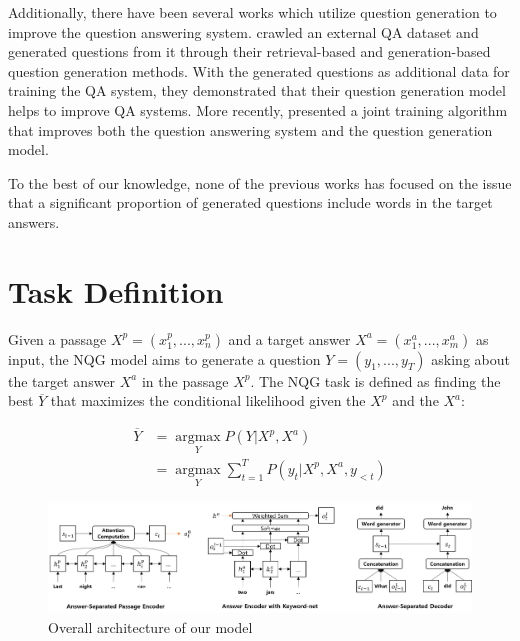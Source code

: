 \documentclass[letterpaper]{article} %
\begin{document}
Additionally, there have been several works which utilize question generation to improve the question answering system.
\cite{duan2017question} crawled an external QA dataset and generated questions from it through their retrieval-based and generation-based question generation methods. With the generated questions as additional data for training the QA system, they demonstrated that their question generation model helps to improve QA systems.
More recently,\cite{tang2018learning} presented a joint training algorithm that improves both the question answering system and the question generation model.

To the best of our knowledge, none of the previous works has focused on the issue that a significant proportion of generated questions include words in the target answers.

\section{Task Definition}
Given a passage \(X^p = (x^p_1, ...,x^p_n)\) and a target answer \(X^a = (x^a_1, ..., x^a_m)\) as input, the NQG model aims to generate a question \(Y = (y_1, ...,y_T)\) asking about the target answer \(X^a\) in the passage \(X^p \). The NQG task is defined as finding the best \(\overline{Y}\) that maximizes the conditional likelihood given the \(X^p\) and the \(X^a\):

\begin{align}
\overline{Y} &= \underset{Y}{\operatorname{argmax}} P(Y|X^p, X^a) \label{eq_1} \\
& = \underset{Y}{\operatorname{argmax}} \sum_{t=1}^{T} P(y_t|X^p, X^a, y_{<t}) \label{eq_2}
\end{align}

\begin{figure}[!htb]
	\centering
  	\includegraphics[width = \textwidth ]{overall_architecture.png}
	\caption{Overall architecture of our model}
  	\label{fig:overall_architecture}
\end{figure}
\end{document}
